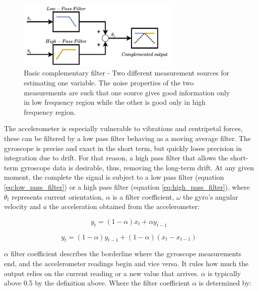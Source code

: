 \begin{figure}[!h]
  \centering
  \includegraphics[width=0.7\textwidth]{figures/complementary.pdf}
  \caption{Basic complementary filter \cite{higgins1975comparison} - Two different measurement sources for estimating one variable. The noise properties of the two measurements are such that one source gives good information only in low frequency region while the other is good only in high frequency region. }
  \label{fig:complementary}
\end{figure}

The accelerometer is especially vulnerable to vibrations and centripetal forces, these can be filtered by a low pass filter behaving as a moving average filter. The gyroscope is precise and exact in the short term, but quickly loses precision in integration due to drift. For that reason, a high pass filter that allows the short-term gyroscope data is desirable, thus, removing the long-term drift.
At any given moment, the complete the signal is subject to a low pass filter (equation \ref{eq:low_pass_filter}) or a high pass filter (equation \ref{eq:high_pass_filter}), where $\theta_t$ represents current orientation, $\alpha$ is a filter coefficient, $\omega$ the gyro's angular velocity and $a$ the acceleration obtained from the accelerometer:

\begin{equation}
  y_t = (1-\alpha)x_{t} + \alpha y_{t-1}
  \label{eq:low_pass_filter}
\end{equation}

\begin{equation}
  y_t = (1-\alpha)y_{t-1} + (1-\alpha) (x_t - x_{t-1})
  \label{eq:high_pass_filter}
\end{equation}

$\alpha$ filter coefficient describes the borderline where the gyroscope measurements end, and the accelerometer readings begin and vice versa. It rules how much the output relies on the current reading or a new value that arrives. $\alpha$ is typically above 0.5 by the definition above. Where the filter coefficient $\alpha$ is determined by:

